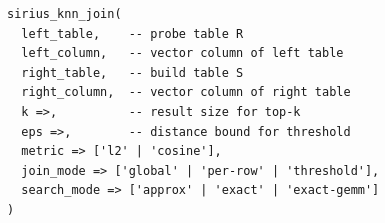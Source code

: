 
\begin{table}[t]
    \centering
    \captionsetup{textfont=normalfont}
    \caption{The Sirius vector join table function.}
    \label{tab:tvf-signature}
    \vjrule{\heavyrulewidth}
    \begin{tcolorbox}[vjcard]
        \begin{lstlisting}[style=vjcolor,label={lst:table-function}]
sirius_knn_join(
  left_table,    -- probe table R
  left_column,   -- vector column of left table
  right_table,   -- build table S
  right_column,  -- vector column of right table
  k =>,          -- result size for top-k
  eps =>,        -- distance bound for threshold
  metric => ['l2' | 'cosine'],
  join_mode => ['global' | 'per-row' | 'threshold'],
  search_mode => ['approx' | 'exact' | 'exact-gemm']
)
\end{lstlisting}
    \end{tcolorbox}
    \vjrule{\heavyrulewidth}
\end{table}
